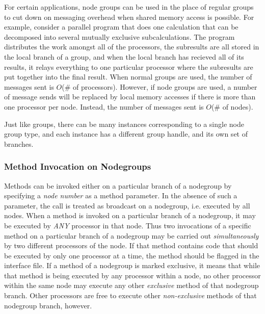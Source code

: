 For certain applications, node groups can be used in the place of
regular groups to cut down on messaging overhead when shared memory
access is possible.  For example, consider a parallel program that
does one calculation that can be decomposed into several mutually
exclusive subcalculations.  The program distributes the work amongst
all of the processors, the subresults are all stored in the local
branch of a group, and when the local branch has recieved all of its
results, it relays everything to one particular processor where the
subresults are put together into the final result.  When normal groups
are used, the number of messages sent is $O$(\# of processors).
However, if node groups are used, a number of message sends will be
replaced by local memory accesses if there is more than
one processor per node.  Instead, the number of messages sent is
$O$(\# of nodes).

Just like groups, there can be many instances corresponding to a single node
group type, and each instance has a different group handle, and its own set of
branches.


\subsubsection{Method Invocation on Nodegroups}

Methods can be invoked either on a particular branch
of a nodegroup by specifying a {\em node number} as a method
parameter. In the absence of such a parameter, the call is treated as broadcast
on a nodegroup, i.e. executed by all nodes. When a method is
invoked on a particular branch of a nodegroup,
it may be executed by {\em ANY} processor in that node. Thus two invocations of
a specific method on a particular branch of a
nodegroup may be carried out {\em simultaneously} by two
different processors of the node. If that method contains code that
should be executed by only one processor at a time, the method should
be flagged
 in the interface file. If a method  of a
nodegroup  is marked exclusive, it means that while that method is being
executed by any processor within a node, no other processor within the same
node may execute any other {\em exclusive} method of that
nodegroup branch.  Other processors are free to
execute other {\em non-exclusive} methods of that nodegroup
branch, however.

